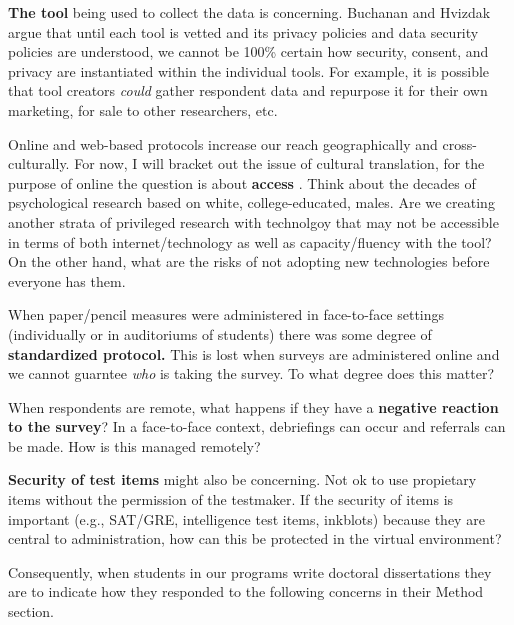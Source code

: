 \documentclass[
  english,
]{book}
\begin{document}
\textbf{The tool} being used to collect the data is concerning. Buchanan and Hvizdak \citeyearpar{buchanan_online_2009} argue that until each tool is vetted and its privacy policies and data security policies are understood, we cannot be 100\% certain how security, consent, and privacy are instantiated within the individual tools. For example, it is possible that tool creators \emph{could} gather respondent data and repurpose it for their own marketing, for sale to other researchers, etc.

Online and web-based protocols increase our reach geographically and cross-culturally. For now, I will bracket out the issue of cultural translation, for the purpose of online the question is about \textbf{access} \citep{conrad_survey_2007}. Think about the decades of psychological research based on white, college-educated, males. Are we creating another strata of privileged research with technolgoy that may not be accessible in terms of both internet/technology as well as capacity/fluency with the tool? On the other hand, what are the risks of not adopting new technologies before everyone has them.

When paper/pencil measures were administered in face-to-face settings (individually or in auditoriums of students) there was some degree of \textbf{standardized protocol.} This is lost when surveys are administered online and we cannot guarntee \emph{who} is taking the survey. To what degree does this matter?

When respondents are remote, what happens if they have a \textbf{negative reaction to the survey}? In a face-to-face context, debriefings can occur and referrals can be made. How is this managed remotely?

\textbf{Security of test items} might also be concerning. Not ok to use propietary items without the permission of the testmaker. If the security of items is important (e.g., SAT/GRE, intelligence test items, inkblots) because they are central to administration, how can this be protected in the virtual environment?

Consequently, when students in our programs write doctoral dissertations they are to indicate how they responded to the following concerns in their Method section.
\end{document}
